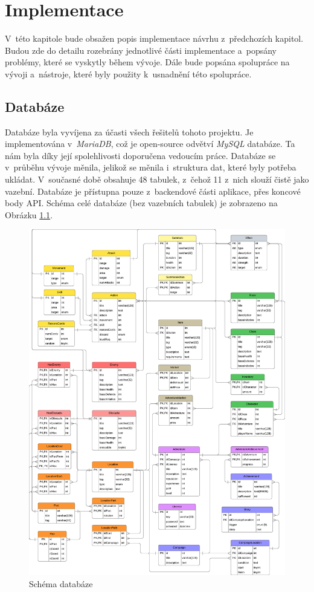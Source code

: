 \chapter{Implementace}
V~této kapitole bude obsažen popis implementace návrhu z~předchozích kapitol. Budou zde do detailu rozebrány jednotlivé části implementace a~popsány problémy, které se vyskytly během vývoje. Dále bude popsána spolupráce na vývoji a~nástroje, které byly použity k~usnadnění této spolupráce.

\section{Databáze}
Databáze byla vyvíjena za účasti všech řešitelů tohoto projektu. Je implementována v~\textit{MariaDB}, což je open-source odvětví \textit{MySQL} databáze. Ta nám byla díky její spolehlivosti doporučena vedoucím práce. Databáze se v~průběhu vývoje měnila, jelikož se měnila i~struktura dat, které byly potřeba ukládat. V~současné době obsahuje 48 tabulek, z~čehož 11 z~nich slouží čistě jako vazební. Databáze je přístupna pouze z~backendové části aplikace, přes koncové body API. Schéma celé databáze (bez vazebních tabulek) je zobrazeno na Obrázku \ref{fig:db_schema}.

\begin{figure}[htbp]
  \centering
  \includegraphics[width=.95\textwidth]{../../shared/diagrams/dbScheme.pdf}
  \caption{Schéma databáze}
  \label{fig:db_schema}
\end{figure}

